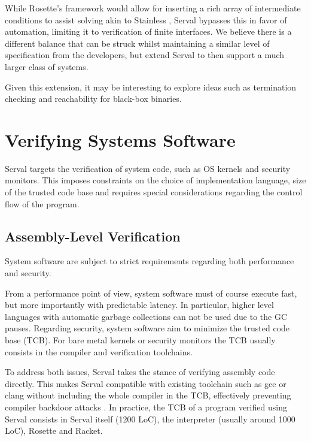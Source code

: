 \documentclass[11pt,a4paper]{article}
\newcommand{\serval}{Serval\xspace}
\newcommand{\racket}{\textsf{Racket}\xspace}
\newcommand{\rosette}{\textsf{Rosette}\xspace}
\newcommand{\gcc}{\textsf{gcc}\xspace}
\newcommand{\cclang}{\textsf{clang}\xspace}
\begin{document}
While \rosette's framework would allow for inserting a rich array of
intermediate conditions to assist solving akin to Stainless \cite{stainless},
\serval bypasses this in favor of automation, limiting it to verification of
finite interfaces. We believe there is a different balance that can be struck
whilst maintaining a similar level of specification from the developers, but
extend \serval to then support a much larger class of systems.

Given this extension, it may be interesting to explore ideas such as termination
checking and reachability for black-box binaries.


\section{Verifying Systems Software}
\label{system}

Serval targets the verification of system code, such as OS kernels and security
monitors.
This imposes constraints on the choice of implementation language, size of the
trusted code base and requires special considerations regarding the control flow
of the program.

\subsection{Assembly-Level Verification}

System software are subject to strict requirements regarding both performance
and security.

From a performance point of view, system software must of course execute fast,
but more importantly with predictable latency.
In particular, higher level languages with automatic garbage collections can not
be used due to the GC pauses.
Regarding security, system software aim to minimize the trusted code base (TCB).
For bare metal kernels or security monitors the TCB usually consists in the
compiler and verification toolchains.

To address both issues, Serval takes the stance of verifying assembly code
directly.
This makes Serval compatible with existing toolchain such as \gcc{} or \cclang{}
without including the whole compiler in the TCB, effectively preventing compiler
backdoor attacks \cite{trustingtrust}.
In practice, the TCB of a program verified using Serval consists in Serval
itself (1200 LoC), the interpreter (usually around 1000 LoC), \rosette{} and
\racket{}.
\end{document}
